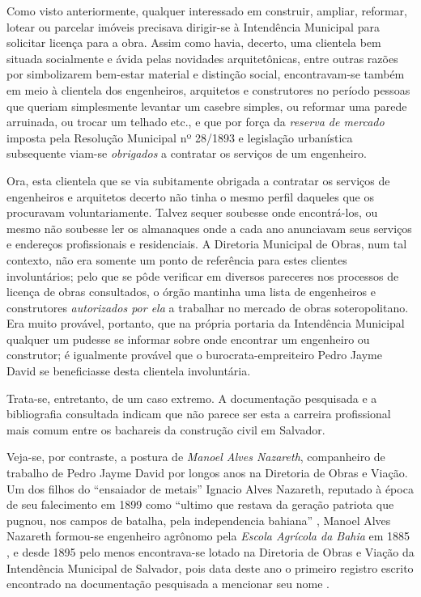 Como visto anteriormente, qualquer interessado em construir, ampliar, reformar, lotear ou parcelar imóveis precisava dirigir-se à Intendência Municipal para solicitar licença para a obra. Assim como havia, decerto, uma clientela bem situada socialmente e ávida pelas novidades arquitetônicas, entre outras razões por simbolizarem bem-estar material e distinção social, encontravam-se também em meio à clientela dos engenheiros, arquitetos e construtores no período pessoas que queriam simplesmente levantar um casebre simples, ou reformar uma parede arruinada, ou trocar um telhado etc., e que por força da \textit{reserva de mercado} imposta pela Resolução Municipal nº 28/1893 e legislação urbanística subsequente viam-se \textit{obrigados} a contratar os serviços de um engenheiro.

Ora, esta clientela que se via subitamente obrigada a contratar os serviços de engenheiros e arquitetos decerto não tinha o mesmo perfil daqueles que os procuravam voluntariamente. Talvez sequer soubesse onde encontrá-los, ou mesmo não soubesse ler os almanaques onde a cada ano anunciavam seus serviços e endereços profissionais e residenciais. A Diretoria Municipal de Obras, num tal contexto, não era somente um ponto de referência para estes clientes involuntários; pelo que se pôde verificar em diversos pareceres nos processos de licença de obras consultados, o órgão mantinha uma lista de engenheiros e construtores \textit{autorizados por ela} a trabalhar no mercado de obras soteropolitano. Era muito provável, portanto, que na própria portaria da Intendência Municipal qualquer um pudesse se informar sobre onde encontrar um engenheiro ou construtor; é igualmente provável que o burocrata-empreiteiro Pedro Jayme David se beneficiasse desta clientela involuntária.

Trata-se, entretanto, de um caso extremo. A documentação pesquisada e a bibliografia consultada indicam que não parece ser esta a carreira profissional mais comum entre os bachareis da construção civil em Salvador.

Veja-se, por contraste, a postura de \textit{Manoel Alves Nazareth}, companheiro de trabalho de Pedro Jayme David por longos anos na Diretoria de Obras e Viação. Um dos filhos do ``ensaiador de metais'' Ignacio Alves Nazareth, reputado à época de seu falecimento em 1899 como ``ultimo que restava da geração patriota que pugnou, nos campos de batalha, pela independencia bahiana'' \cite{apontamentos_1899}, Manoel Alves Nazareth formou-se engenheiro agrônomo pela \textit{Escola Agrícola da Bahia} em 1885 \cite[p.~141]{araujo_agronomia_2010}, e desde 1895 pelo menos encontrava-se lotado na Diretoria de Obras e Viação da Intendência Municipal de Salvador, pois data deste ano o primeiro registro escrito encontrado na documentação pesquisada a mencionar seu nome \cite{salvador_relatorio_1895}. 

